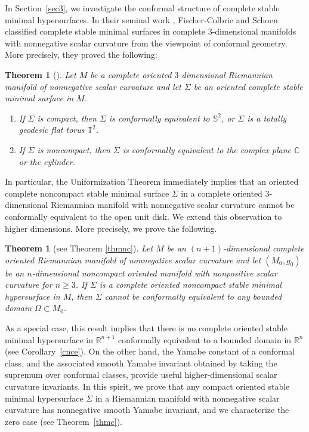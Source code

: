 \documentclass[amssymb,amstex,amsmath,11pt]{article}
\numberwithin{equation}{section}
\theoremstyle{plain}
\newtheorem{thm}{Theorem}[section]
\newtheorem*{thm*}{Theorem}
\theoremstyle{definition}
\theoremstyle{remark}
\newcommand{\Om}{\Omega}
\begin{document}
In Section~\ref{sec3}, we investigate the conformal structure of complete stable minimal hypersurfaces. In their seminal work \cite{FC&S80}, Fischer-Colbrie and Schoen classified complete stable minimal surfaces in complete $3$-dimensional manifolds with nonnegative scalar curvature from the viewpoint of conformal geometry. More precisely, they proved the following:

\begin{thm}[\cite{FC&S80}] \label{FCS3}
    Let $M$ be a complete oriented $3$-dimensional Riemannian manifold of nonnegative scalar curvature and let $\Sigma$ be an oriented complete stable minimal surface in $M$.
    \begin{enumerate}
        \item[{\rm (i)}] If $\Sigma$ is compact, then $\Sigma$ is conformally equivalent to $\mathbb{S}^2$, or $\Sigma$ is a totally geodesic flat torus $\mathbb{T}^2$.
        \item[{\rm (ii)}] If $\Sigma$ is noncompact, then $\Sigma$ is conformally equivalent to the complex plane $\mathbb{C}$ or the cylinder.
    \end{enumerate}
\end{thm}

\noindent In particular, the Uniformization Theorem immediately implies that an oriented complete noncompact stable minimal surface $\Sigma$ in a complete oriented $3$-dimensional Riemannian manifold with nonnegative scalar curvature cannot be conformally equivalent to the open unit disk. We extend this observation to higher dimensions. More precisely, we prove the following.

\begin{thm*} [see Theorem \ref{thmnc}]
    Let $M$ be an $(n+1)$-dimensional complete oriented Riemannian manifold of nonnegative scalar curvature and let $(M_0,g_0)$ be an $n$-dimensional noncompact oriented manifold with nonpositive scalar curvature for $n\geq 3$.
    If $\Sigma$ is a complete oriented noncompact stable minimal hypersurface in $M$, then $\Sigma$ cannot be conformally equivalent to any bounded domain $\Om\subset M_0$.
\end{thm*}
\noindent As a special case, this result implies that there is no complete oriented stable minimal hypersurface in $\mathbb{R}^{n+1}$ conformally equivalent to a bounded domain in $\mathbb{R}^n$ (see Corollary~\ref{cnce}). On the other hand, the Yamabe constant of a conformal class, and the associated smooth Yamabe invariant obtained by taking the supremum over conformal classes, provide useful higher-dimensional scalar curvature invariants. In this spirit, we prove that any compact oriented stable minimal hypersurface $\Sigma$ in a Riemannian manifold with nonnegative scalar curvature has nonnegative smooth Yamabe invariant, and we characterize the zero case (see Theorem~\ref{thmc}).
\end{document}
